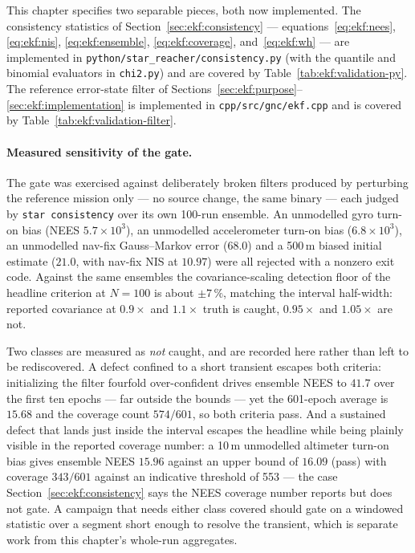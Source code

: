 This chapter specifies two separable pieces, both now implemented. The
consistency statistics of Section~\ref{sec:ekf:consistency} ---
equations~\eqref{eq:ekf:nees}, \eqref{eq:ekf:nis},
\eqref{eq:ekf:ensemble}, \eqref{eq:ekf:coverage},
and~\eqref{eq:ekf:wh} --- are implemented in
\texttt{python/star\_reacher/consistency.py} (with the quantile and
binomial evaluators in \texttt{chi2.py}) and are covered by
Table~\ref{tab:ekf:validation-py}. The reference error-state filter of
Sections~\ref{sec:ekf:purpose}--\ref{sec:ekf:implementation} is
implemented in \texttt{cpp/src/gnc/ekf.cpp} and is covered by
Table~\ref{tab:ekf:validation-filter}.

\paragraph{Measured sensitivity of the gate.} The gate was exercised
against deliberately broken filters produced by perturbing the reference
mission only --- no source change, the same binary --- each judged by
\texttt{star consistency} over its own 100-run ensemble. An unmodelled
gyro turn-on bias (NEES $5.7 \times 10^{3}$), an unmodelled accelerometer
turn-on bias ($6.8 \times 10^{3}$), an unmodelled nav-fix Gauss--Markov
error ($68.0$) and a 500\,m biased initial estimate ($21.0$, with nav-fix
NIS at $10.97$) were all rejected with a nonzero exit code. Against the
same ensembles the covariance-scaling detection floor of the headline
criterion at $N = 100$ is about $\pm 7\,\%$, matching the interval
half-width: reported covariance at $0.9\times$ and $1.1\times$ truth is
caught, $0.95\times$ and $1.05\times$ are not.

Two classes are measured as \emph{not} caught, and are recorded here
rather than left to be rediscovered. A defect confined to a short
transient escapes both criteria: initializing the filter fourfold
over-confident drives ensemble NEES to $41.7$ over the first ten epochs
--- far outside the bounds --- yet the 601-epoch average is $15.68$ and
the coverage count $574/601$, so both criteria pass. And a sustained
defect that lands just inside the interval escapes the headline while
being plainly visible in the reported coverage number: a 10\,m
unmodelled altimeter turn-on bias gives ensemble NEES $15.96$ against an
upper bound of $16.09$ (pass) with coverage $343/601$ against an
indicative threshold of 553 --- the case
Section~\ref{sec:ekf:consistency} says the NEES coverage number reports
but does not gate. A campaign that needs either class covered should
gate on a windowed statistic over a segment short enough to resolve the
transient, which is separate work from this chapter's whole-run
aggregates.

